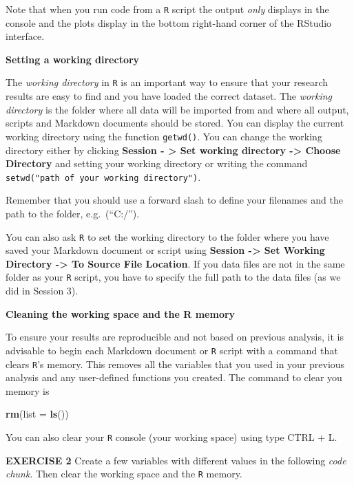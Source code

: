 \documentclass[
]{article}
\newenvironment{Shaded}{\begin{snugshade}}{\end{snugshade}}
\newcommand{\DataTypeTok}[1]{\textcolor[rgb]{0.13,0.29,0.53}{#1}}
\newcommand{\KeywordTok}[1]{\textcolor[rgb]{0.13,0.29,0.53}{\textbf{#1}}}
\newcommand{\NormalTok}[1]{#1}
\begin{document}
Note that when you run code from a \texttt{R} script the output
\emph{only} displays in the console and the plots display in the bottom
right-hand corner of the RStudio interface.

\textbf{Setting a working directory}

The \emph{working directory} in \texttt{R} is an important way to ensure
that your research results are easy to find and you have loaded the
correct dataset. The \emph{working directory} is the folder where all
data will be imported from and where all output, scripts and Markdown
documents should be stored. You can display the current working
directory using the function \texttt{getwd()}. You can change the
working directory either by clicking \textbf{Session - \textgreater{}
Set working directory -\textgreater{} Choose Directory} and setting your
working directory or writing the command
\texttt{setwd("path\ of\ your\ working\ directory")}.

Remember that you should use a forward slash to define your filenames
and the path to the folder, e.g.~(``C:/'').

You can also ask \texttt{R} to set the working directory to the folder
where you have saved your Markdown document or script using
\textbf{Session -\textgreater{} Set Working Directory -\textgreater{} To
Source File Location}. If you data files are not in the same folder as
your \texttt{R} script, you have to specify the full path to the data
files (as we did in Session 3).

\textbf{Cleaning the working space and the R memory}

To ensure your results are reproducible and not based on previous
analysis, it is advisable to begin each Markdown document or \texttt{R}
script with a command that clears \texttt{R}'s memory. This removes all
the variables that you used in your previous analysis and any
user-defined functions you created. The command to clear you memory is

\begin{Shaded}
\begin{Highlighting}[]
\KeywordTok{rm}\NormalTok{(}\DataTypeTok{list =} \KeywordTok{ls}\NormalTok{())}
\end{Highlighting}
\end{Shaded}

You can also clear your \texttt{R} console (your working space) using
type CTRL + L.

\textbf{EXERCISE 2} Create a few variables with different values in the
following \emph{code chunk}. Then clear the working space and the
\texttt{R} memory.
\end{document}
